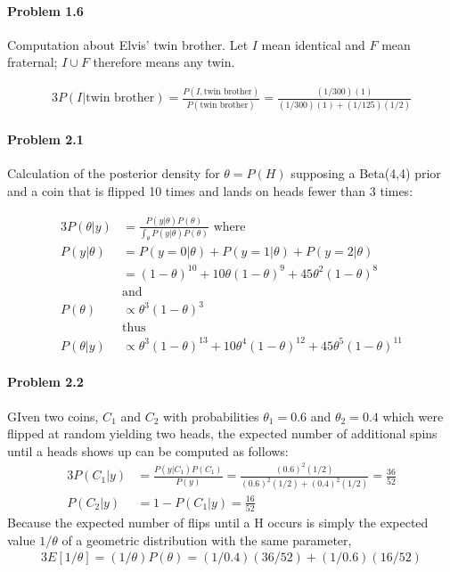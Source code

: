 \documentclass[10pt]{article}
\begin{document}
\paragraph{Problem 1.6} Computation about Elvis' twin brother. Let $I$ mean identical and $F$ mean fraternal; $I \cup F$ therefore means any twin.

\begin{alignat*}{3}
P(I | \text{twin brother})=\frac{P(I,\text{twin brother})}{P(\text{twin brother})}=\frac{(1/300)(1)}{(1/300)(1)+(1/125)(1/2)}
\end{alignat*}

\paragraph{Problem 2.1} Calculation of the posterior density for $\theta=P(H)$ supposing a Beta(4,4) prior and a coin that is flipped 10 times and lands on heads fewer than 3 times:

\begin{alignat*}{3}
P(\theta | y)&=\frac{P(y|\theta)P(\theta)}{\int_\theta P(y|\theta)P(\theta)} \text{ where} \\
P(y|\theta)&=P(y=0|\theta)+P(y=1|\theta)+P(y=2|\theta) \\
&=(1-\theta)^{10} + 10\theta(1-\theta)^9+45\theta^2(1-\theta)^8 \\
&\text{and} \\
P(\theta)&\propto \theta^3(1-\theta)^3 \\
&\text{thus} \\
P(\theta | y)&\propto \theta^3(1-\theta)^{13} + 10\theta^4(1-\theta)^12+45\theta^5(1-\theta)^{11}
\end{alignat*}

\paragraph{Problem 2.2} GIven two coins, $C_1$ and $C_2$ with probabilities $\theta_1=0.6$ and $\theta_2=0.4$ which were flipped at random yielding two heads, the expected number of additional spins until a heads shows up can be computed as follows:
\begin{alignat*}{3}
P(C_1|y)&=\frac{P(y|C_1)P(C_1)}{P(y)}=\frac{(0.6)^2(1/2)}{(0.6)^2(1/2)+(0.4)^2(1/2)}=\frac{36}{52} \\
P(C_2 | y)&=1-P(C_1|y)=\frac{16}{52}
\end{alignat*}
Because the expected number of flips until a H occurs is simply the expected value $1/\theta$ of a geometric distribution with the same parameter,
\begin{alignat*}{3}
E[1/\theta]=(1/\theta)P(\theta)=(1/0.4)(36/52)+(1/0.6)(16/52)
\end{alignat*}
\end{document}
